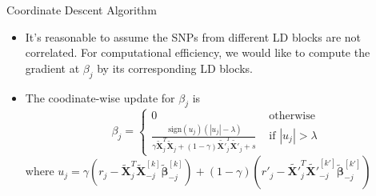 \documentclass{beamer}
\begin{document}
\begin{frame}{Coordinate Descent Algorithm}
\begin{itemize}
    \item It’s reasonable to assume the SNPs from different LD blocks are not correlated. For computational efficiency, we would like to compute the gradient at $\beta_j$ by its corresponding LD blocks. \\
    \item The coodinate-wise update for $\beta_j$ is
\begin{equation}
    \beta_{j}= \begin{cases}0 & \text { otherwise } \\ \frac{\text{ sign}(u_j)(\left|u_j\right| - \lambda)}{\gamma \tilde{\boldsymbol{X}}_{j}^{T} \tilde{\boldsymbol{X}}_{j} + (1-\gamma) \tilde{\boldsymbol{X'}}_{j}^{T} \tilde{\boldsymbol{X'}}_{j} + s} & \text { if }\left|u_j\right| > \lambda \end{cases}
    \label{equation_update_beta}
\end{equation}
where $u_j=\gamma \left(r_{j}-\tilde{\boldsymbol{X}}_{j}^{T} \tilde{\boldsymbol{X}}_{-j}^{[k]} \tilde{\boldsymbol{\beta}}_{-j}^{[k]}\right) + (1-\gamma) \left(r'_{j}-\tilde{\boldsymbol{X'}}_{j}^{T} \tilde{\boldsymbol{X'}}_{-j}^{[k']} \tilde{\boldsymbol{\beta}}_{-j}^{[k']}\right)$
\end{itemize}
\end{frame}
\end{document}
